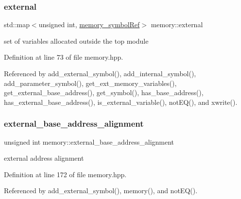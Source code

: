 \mbox{\label{classmemory_ae45a5824c5d97979940f500436f1e1a7}} 
\subsubsection{\texorpdfstring{external}{external}}
{\footnotesize\ttfamily std\+::map$<$unsigned int, \hyperlink{memory__symbol_8hpp_af3608dbc27177447c2d777fa712cc82a}{memory\+\_\+symbol\+Ref}$>$ memory\+::external\hspace{0.3cm}{\ttfamily [private]}}



set of variables allocated outside the top module 



Definition at line 73 of file memory.\+hpp.



Referenced by add\+\_\+external\+\_\+symbol(), add\+\_\+internal\+\_\+symbol(), add\+\_\+parameter\+\_\+symbol(), get\+\_\+ext\+\_\+memory\+\_\+variables(), get\+\_\+external\+\_\+base\+\_\+address(), get\+\_\+symbol(), has\+\_\+base\+\_\+address(), has\+\_\+external\+\_\+base\+\_\+address(), is\+\_\+external\+\_\+variable(), not\+E\+Q(), and xwrite().

\mbox{\label{classmemory_a6e43571c74b6e7627406a0f0b14e7756}} 
\subsubsection{\texorpdfstring{external\+\_\+base\+\_\+address\+\_\+alignment}{external\_base\_address\_alignment}}
{\footnotesize\ttfamily unsigned int memory\+::external\+\_\+base\+\_\+address\+\_\+alignment\hspace{0.3cm}{\ttfamily [private]}}



external address alignment 



Definition at line 172 of file memory.\+hpp.



Referenced by add\+\_\+external\+\_\+symbol(), memory(), and not\+E\+Q().


